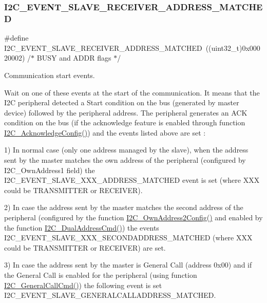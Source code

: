 \subsubsection{\texorpdfstring{I2C\_EVENT\_SLAVE\_RECEIVER\_ADDRESS\_MATCHED}{I2C\_EVENT\_SLAVE\_RECEIVER\_ADDRESS\_MATCHED}}
{\footnotesize\ttfamily \#define I2\+C\+\_\+\+E\+V\+E\+N\+T\+\_\+\+S\+L\+A\+V\+E\+\_\+\+R\+E\+C\+E\+I\+V\+E\+R\+\_\+\+A\+D\+D\+R\+E\+S\+S\+\_\+\+M\+A\+T\+C\+H\+ED~((uint32\+\_\+t)0x00020002) /$\ast$ B\+U\+S\+Y and A\+D\+D\+R flags $\ast$/}



Communication start events. 

Wait on one of these events at the start of the communication. It means that the I2C peripheral detected a Start condition on the bus (generated by master device) followed by the peripheral address. The peripheral generates an A\+CK condition on the bus (if the acknowledge feature is enabled through function \mbox{\hyperlink{group___i2_c___exported___functions_ga7bb44e894d68a7991f564c43fb187486}{I2\+C\+\_\+\+Acknowledge\+Config()}}) and the events listed above are set \+:

1) In normal case (only one address managed by the slave), when the address sent by the master matches the own address of the peripheral (configured by I2\+C\+\_\+\+Own\+Address1 field) the I2\+C\+\_\+\+E\+V\+E\+N\+T\+\_\+\+S\+L\+A\+V\+E\+\_\+\+X\+X\+X\+\_\+\+A\+D\+D\+R\+E\+S\+S\+\_\+\+M\+A\+T\+C\+H\+ED event is set (where X\+XX could be T\+R\+A\+N\+S\+M\+I\+T\+T\+ER or R\+E\+C\+E\+I\+V\+ER).

2) In case the address sent by the master matches the second address of the peripheral (configured by the function \mbox{\hyperlink{group___i2_c___exported___functions_ga7be2cc634a613c8e3539137e897a22df}{I2\+C\+\_\+\+Own\+Address2\+Config()}} and enabled by the function \mbox{\hyperlink{group___i2_c___exported___functions_ga02145a333a56e79557d6ef4ea03fc313}{I2\+C\+\_\+\+Dual\+Address\+Cmd()}}) the events I2\+C\+\_\+\+E\+V\+E\+N\+T\+\_\+\+S\+L\+A\+V\+E\+\_\+\+X\+X\+X\+\_\+\+S\+E\+C\+O\+N\+D\+A\+D\+D\+R\+E\+S\+S\+\_\+\+M\+A\+T\+C\+H\+ED (where X\+XX could be T\+R\+A\+N\+S\+M\+I\+T\+T\+ER or R\+E\+C\+E\+I\+V\+ER) are set.

3) In case the address sent by the master is General Call (address 0x00) and if the General Call is enabled for the peripheral (using function \mbox{\hyperlink{group___i2_c___exported___functions_ga65c740fc8d7b3b9f15cc432d8699d471}{I2\+C\+\_\+\+General\+Call\+Cmd()}}) the following event is set I2\+C\+\_\+\+E\+V\+E\+N\+T\+\_\+\+S\+L\+A\+V\+E\+\_\+\+G\+E\+N\+E\+R\+A\+L\+C\+A\+L\+L\+A\+D\+D\+R\+E\+S\+S\+\_\+\+M\+A\+T\+C\+H\+ED. \mbox{\label{group___i2_c___events_ga17e78ab01fa980b3df10f8d9f6864c48}} 
